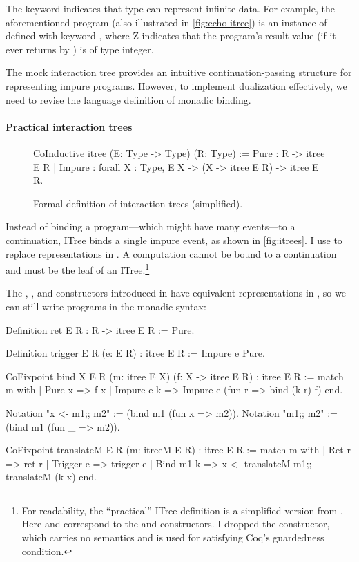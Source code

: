 The  keyword indicates that type  can represent
infinite data.  For example, the aforementioned  program (also
illustrated in \autoref{fig:echo-itree}) is an instance of  defined with keyword , where \ilc Z indicates that the
program's result value (if it ever returns by ) is of type integer.

The mock interaction tree provides an intuitive continuation-passing structure
for representing impure programs.  However, to implement dualization
effectively, we need to revise the language definition of monadic binding.

\paragraph{Practical interaction trees}

\begin{figure}
\begin{coq}
  CoInductive itree (E: Type -> Type) (R: Type) :=
    Pure   : R -> itree E R
  | Impure : forall {X : Type}, E X -> (X -> itree E R) -> itree E R.
\end{coq}
\caption{Formal definition of interaction trees (simplified).}
\label{fig:itrees}
\end{figure}

Instead of binding a program---which might have many events---to a continuation,
ITree binds a single impure event, as shown in \autoref{fig:itrees}.  I
use  to replace  representations
in .  A  computation cannot be bound to a continuation and
must be the leaf of an ITree.\footnote{For readability, the ``practical'' ITree
definition is a simplified version from \citet{itree}.  Here 
and  correspond to the  and  constructors.  I
dropped the  constructor, which carries no
semantics and is used for satisfying Coq's guardedness condition.}

The , , and  constructors introduced in
 have equivalent representations in , so we can still
write programs in the monadic syntax:
\begin{coq}
  Definition ret {E R} : R -> itree E R := Pure.
  
  Definition trigger {E R} (e: E R) : itree E R := Impure e Pure.

  CoFixpoint bind {X E R} (m: itree E X) (f: X -> itree E R) : itree E R :=
    match m with
    | Pure   x   => f x
    | Impure e k => Impure e (fun r => bind (k r) f)
    end.

  Notation "x <- m1;; m2" := (bind m1 (fun x => m2)).
  Notation "m1;; m2"      := (bind m1 (fun _ => m2)).

  CoFixpoint translateM {E R} (m: itreeM E R) : itree E R :=
    match m with
    | Ret     r => ret r
    | Trigger e => trigger e
    | Bind m1 k => x <- translateM m1;; translateM (k x)
    end.
\end{coq}
\vspace*{1em}

